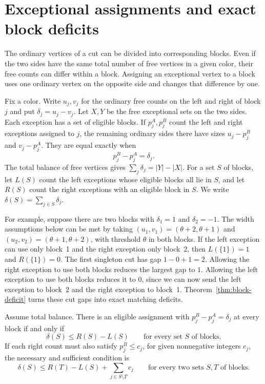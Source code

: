 \section{Exceptional assignments and exact block deficits}\label{sec:block-routing}

The ordinary vertices of a cut can be divided into corresponding blocks. Even if the two sides have the same total number of free vertices in a given color, their free counts can differ within a block. Assigning an exceptional vertex to a block uses one ordinary vertex on the opposite side and changes that difference by one.

Fix a color. Write \(u_j,v_j\) for the ordinary free counts on the left and right of block \(j\) and put \(\delta_j=u_j-v_j\). Let \(X,Y\) be the free exceptional sets on the two sides. Each exception has a set of eligible blocks. If \(p^A_j,p^B_j\) count the left and right exceptions assigned to \(j\), the remaining ordinary sides there have sizes \(u_j-p^B_j\) and \(v_j-p^A_j\). They are equal exactly when
\[
 p^B_j-p^A_j=\delta_j.
\]
The total balance of free vertices gives \(\sum_j\delta_j=|Y|-|X|\). For a set \(S\) of blocks, let \(L(S)\) count the left exceptions whose eligible blocks all lie in \(S\), and let \(R(S)\) count the right exceptions with an eligible block in \(S\). We write \(\delta(S)=\sum_{j\in S}\delta_j\).

For example, suppose there are two blocks with \(\delta_1=1\) and \(\delta_2=-1\). The width assumptions below can be met by taking \((u_1,v_1)=(\theta+2,\theta+1)\) and \((u_2,v_2)=(\theta+1,\theta+2)\), with threshold \(\theta\) in both blocks. If the left exception can use only block~1 and the right exception only block~2, then \(L(\{1\})=1\) and \(R(\{1\})=0\). The first singleton cut has gap \(1-0+1=2\). Allowing the right exception to use both blocks reduces the largest gap to \(1\). Allowing the left exception to use both blocks reduces it to \(0\), since we can now send the left exception to block~2 and the right exception to block~1. Theorem~\ref{thm:block-deficit} turns these cut gaps into exact matching deficits.

\begin{lemma}\label{lem:block-assignment}
Assume total balance. There is an eligible assignment with \(p^B_j-p^A_j=\delta_j\) at every block if and only if
\[
 \delta(S)\le R(S)-L(S)
 \qquad\text{for every set \(S\) of blocks.}
 \tag{A}\label{eq:block-assignment}
\]
If each right count must also satisfy \(p^B_j\le c_j\), for given nonnegative integers \(c_j\), the necessary and sufficient condition is
\[
 \delta(S)\le R(T)-L(S)+\sum_{j\in S\setminus T}c_j
 \qquad\text{for every two sets \(S,T\) of blocks.}
 \tag{C}\label{eq:block-capacity}
\]
\end{lemma}

